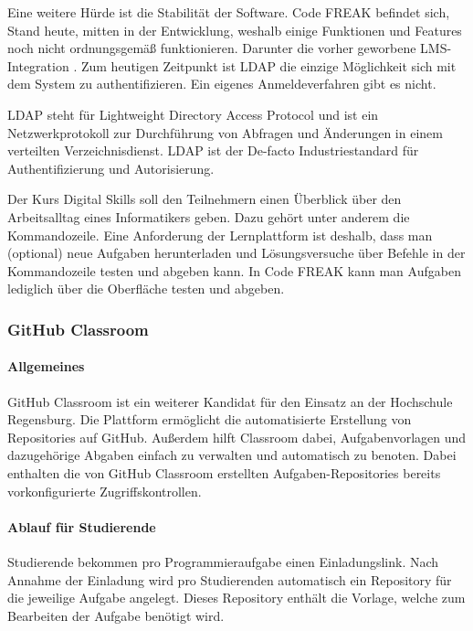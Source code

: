 Eine weitere Hürde ist die Stabilität der Software. Code FREAK befindet sich,
Stand heute, mitten in der Entwicklung, weshalb einige Funktionen und Features
noch nicht ordnungsgemäß funktionieren. Darunter die vorher geworbene
LMS-Integration \parencite{codefreak-docs}. Zum heutigen Zeitpunkt ist LDAP die
einzige Möglichkeit sich mit dem System zu authentifizieren. Ein eigenes
Anmeldeverfahren gibt es nicht.

LDAP steht für \glqq Lightweight Directory Access Protocol\grqq{} und ist ein
Netzwerkprotokoll zur Durchführung von Abfragen und Änderungen in einem 
verteilten Verzeichnisdienst. LDAP ist der De-facto Industriestandard für
Authentifizierung und Autorisierung. \parencite{ldap}

Der Kurs Digital Skills soll den Teilnehmern einen Überblick über den
Arbeitsalltag eines Informatikers geben. Dazu gehört unter anderem die
Kommandozeile. Eine Anforderung der Lernplattform ist deshalb, dass man
(optional) neue Aufgaben herunterladen und Lösungsversuche über Befehle in der
Kommandozeile testen und abgeben kann. In Code FREAK kann man Aufgaben lediglich
über die Oberfläche testen und abgeben.

\newpage
\subsubsection{GitHub Classroom}
\paragraph{Allgemeines}
GitHub Classroom ist ein weiterer Kandidat für den Einsatz an der
Hochschule Regensburg. Die Plattform ermöglicht die automatisierte
Erstellung von Repositories auf GitHub. Außerdem hilft Classroom dabei,
Aufgabenvorlagen und dazugehörige Abgaben einfach zu verwalten und automatisch
zu benoten. Dabei enthalten die von GitHub Classroom erstellten
Aufgaben-Repositories bereits vorkonfigurierte Zugriffskontrollen. \parencite{github-classroom-startseite}

\paragraph{Ablauf für Studierende}
Studierende bekommen pro Programmieraufgabe einen Einladungslink.
Nach Annahme der Einladung wird pro Studierenden automatisch ein Repository für
die jeweilige Aufgabe angelegt. Dieses Repository enthält die Vorlage,
welche zum Bearbeiten der Aufgabe benötigt wird.

